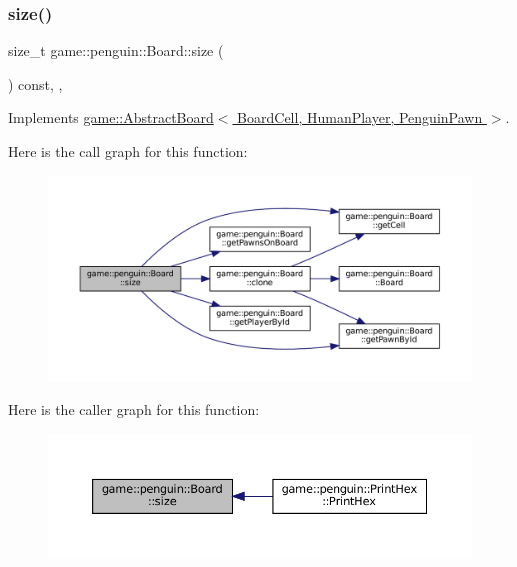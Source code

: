 \subsubsection{\texorpdfstring{size()}{size()}}
{\footnotesize\ttfamily size\+\_\+t game\+::penguin\+::\+Board\+::size (\begin{DoxyParamCaption}{ }\end{DoxyParamCaption}) const\hspace{0.3cm}{\ttfamily [inline]}, {\ttfamily [override]}, {\ttfamily [virtual]}}



Implements \hyperlink{classgame_1_1_abstract_board_a17bd6905ded76d0005437d288fe8ac21}{game\+::\+Abstract\+Board$<$ Board\+Cell, Human\+Player, Penguin\+Pawn $>$}.

Here is the call graph for this function\+:
\nopagebreak
\begin{figure}[H]
\begin{center}
\leavevmode
\includegraphics[width=350pt]{classgame_1_1penguin_1_1_board_a7636e3bdb2da72d2a6395b1a2d846394_cgraph}
\end{center}
\end{figure}
Here is the caller graph for this function\+:
\nopagebreak
\begin{figure}[H]
\begin{center}
\leavevmode
\includegraphics[width=350pt]{classgame_1_1penguin_1_1_board_a7636e3bdb2da72d2a6395b1a2d846394_icgraph}
\end{center}
\end{figure}



